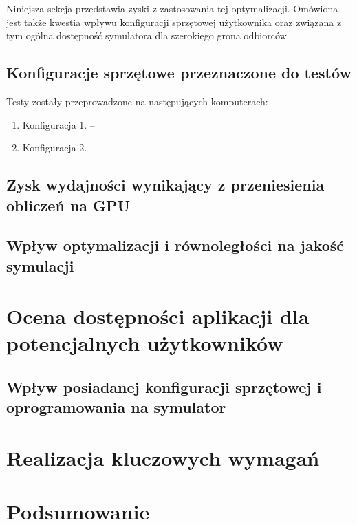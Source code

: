 Niniejsza sekcja przedstawia zyski z zastosowania tej optymalizacji. Omówiona
jest także kwestia wpływu konfiguracji sprzętowej użytkownika oraz związana z
tym ogólna dostępność symulatora dla szerokiego grona odbiorców.

\subsection{Konfiguracje sprzętowe przeznaczone do testów}

Testy zostały przeprowadzone na następujących komputerach:

\begin{enumerate}

\item Konfiguracja 1. -- 

\item Konfiguracja 2. -- 

\end{enumerate}

\subsection{Zysk wydajności wynikający z przeniesienia obliczeń na GPU}

\subsection{Wpływ optymalizacji i równoległości na jakość symulacji}

\section{Ocena dostępności aplikacji dla potencjalnych użytkowników}

\subsection{Wpływ posiadanej konfiguracji sprzętowej i oprogramowania na
symulator}

\section{Realizacja kluczowych wymagań}

\section{Podsumowanie}
